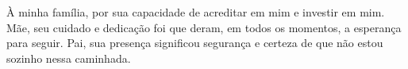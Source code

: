 À minha família, por sua capacidade de acreditar em mim e investir em mim. Mãe, seu cuidado e dedicação foi que deram, em todos os momentos, a esperança para seguir. Pai, sua presença significou segurança e certeza de que não estou sozinho nessa caminhada. 